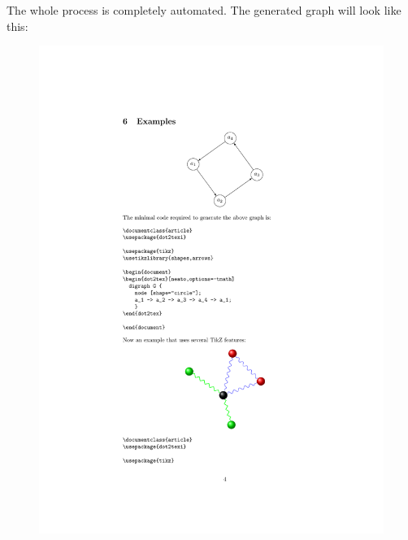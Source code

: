 \documentclass[10pt,a4paper,english]{article}
\begin{document}
The whole process is completely automated. The generated graph will look like this:
\begin{figure}[H]
\centering

\includegraphics{pdf/dot2texiex1}
\end{figure}
\end{document}
